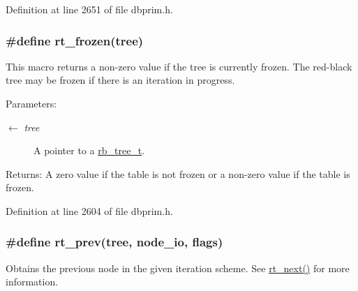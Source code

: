 Definition at line 2651 of file dbprim.h.\hypertarget{group__dbprim__rbtree_ga20}{
\subsubsection[rt\_\-frozen]{\setlength{\rightskip}{0pt plus 5cm}\#define rt\_\-frozen(tree)}}
\label{group__dbprim__rbtree_ga20}


This macro returns a non-zero value if the tree is currently frozen. The red-black tree may be frozen if there is an iteration in progress.

\begin{Desc}
\item[Parameters:]
\begin{description}
\item[\mbox{$\leftarrow$} {\em tree}]A pointer to a \hyperlink{group__dbprim__rbtree_ga0}{rb\_\-tree\_\-t}.\end{description}
\end{Desc}
\begin{Desc}
\item[Returns:]A zero value if the table is not frozen or a non-zero value if the table is frozen.\end{Desc}


Definition at line 2604 of file dbprim.h.\hypertarget{group__dbprim__rbtree_ga29}{
\subsubsection[rt\_\-prev]{\setlength{\rightskip}{0pt plus 5cm}\#define rt\_\-prev(tree, node\_\-io, flags)}}
\label{group__dbprim__rbtree_ga29}


Obtains the previous node in the given iteration scheme. See \hyperlink{group__dbprim__rbtree_ga11}{rt\_\-next()} for more information.

